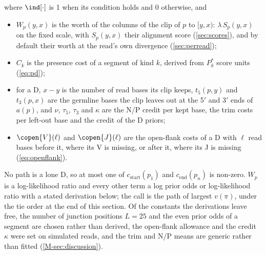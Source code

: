 \documentclass[11pt,a4paper]{article}
\begin{document}
where $\ind[\cdot]$ is 1 when its condition holds and 0 otherwise, and
\begin{itemize}
  \item $W_p(y,x)$ is the worth of the columns of the clip of $p$ to
    $[y,x)$: $\lambda\,S_p(y,x)$ on the fixed scale, with $S_p(y,x)$ their
    alignment score (\cref{sec:scores}), and by default their worth at the
    read's own divergence (\cref{sec:perread});
  \item $C_k$ is the presence cost of a segment of kind $k$, derived from
    $P^{*}_k$ score units (\cref{eq:pd});
  \item for a D, $x-y$ is the number of read bases its clip keeps,
    $t_5(p,y)$ and $t_3(p,x)$ are the germline bases the clip leaves out at
    the 5$'$ and 3$'$ ends of $a(p)$, and $\nu$, $\tau_5$, $\tau_3$ and
    $\kappa$ are the N/P credit per kept base, the trim costs per left-out
    base and the credit of the D priors;
  \item $\copen{V}(\ell)$ and $\copen{J}(\ell)$ are the open-flank costs of
    a D with $\ell$ read bases before it, where its V is missing, or after
    it, where its J is missing (\cref{eq:openflank}).
\end{itemize}
No path is a lone D, so at most one of $c_{\text{start}}(p_1)$ and
$c_{\text{end}}(p_n)$ is non-zero. $W_p$ is a log-likelihood ratio and every
other term a log prior odds or log-likelihood ratio with a stated derivation
below; the call is the path of largest $v(\pi)$, under the tie order at the
end of this section. Of the constants the derivations leave free, the number
of junction positions $L=25$ and the even prior odds of a segment are chosen
rather than derived, the open-flank allowance and the credit $\kappa$ were
set on simulated reads, and the trim and N/P means are generic rather than
fitted (\cref{M-sec:discussion}).
\end{document}
